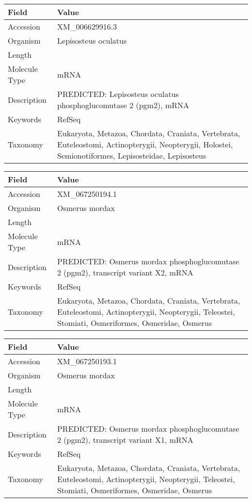 \documentclass[10pt]{article}
\begin{document}
{\footnotesize
\begin{longtable}{>{\raggedright\arraybackslash}p{4.5cm} >{\raggedright\arraybackslash}p{11.5cm}}
\textbf{Field} & \textbf{Value} \\
\hline
Accession & XM\_006629916.3 \\
Organism & Lepisosteus oculatus \\
Length & 4968 \\
Molecule Type & mRNA \\
Description & PREDICTED: Lepisosteus oculatus phosphoglucomutase 2 (pgm2), mRNA \\
Keywords & RefSeq \\
Taxonomy & Eukaryota, Metazoa, Chordata, Craniata, Vertebrata, Euteleostomi, Actinopterygii, Neopterygii, Holostei, Semionotiformes, Lepisosteidae, Lepisosteus \\
\end{longtable}
}

{\footnotesize
\begin{longtable}{>{\raggedright\arraybackslash}p{4.5cm} >{\raggedright\arraybackslash}p{11.5cm}}
\textbf{Field} & \textbf{Value} \\
\hline
Accession & XM\_067250194.1 \\
Organism & Osmerus mordax \\
Length & 2370 \\
Molecule Type & mRNA \\
Description & PREDICTED: Osmerus mordax phosphoglucomutase 2 (pgm2), transcript variant X2, mRNA \\
Keywords & RefSeq \\
Taxonomy & Eukaryota, Metazoa, Chordata, Craniata, Vertebrata, Euteleostomi, Actinopterygii, Neopterygii, Teleostei, Stomiati, Osmeriformes, Osmeridae, Osmerus \\
\end{longtable}
}

{\footnotesize
\begin{longtable}{>{\raggedright\arraybackslash}p{4.5cm} >{\raggedright\arraybackslash}p{11.5cm}}
\textbf{Field} & \textbf{Value} \\
\hline
Accession & XM\_067250193.1 \\
Organism & Osmerus mordax \\
Length & 2478 \\
Molecule Type & mRNA \\
Description & PREDICTED: Osmerus mordax phosphoglucomutase 2 (pgm2), transcript variant X1, mRNA \\
Keywords & RefSeq \\
Taxonomy & Eukaryota, Metazoa, Chordata, Craniata, Vertebrata, Euteleostomi, Actinopterygii, Neopterygii, Teleostei, Stomiati, Osmeriformes, Osmeridae, Osmerus \\
\end{longtable}
}
\end{document}
